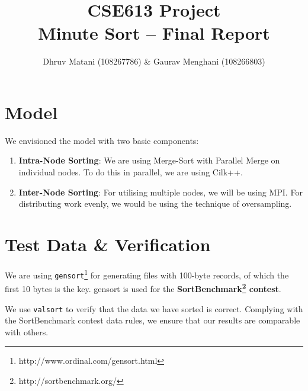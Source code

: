 \documentclass{article}
\title{CSE613 Project\\Minute Sort -- Final Report}
\author{Dhruv Matani (108267786) \& Gaurav Menghani (108266803)}
\begin{document}
\maketitle

\clearpage

\section{Model}
We envisioned the model with two basic components:
\begin{enumerate}
\item {\bf{Intra-Node Sorting}}: We are using Merge-Sort with Parallel Merge on individual nodes. To do this in parallel, 
we are using Cilk++. 

\item {\bf{Inter-Node Sorting}}: For utilising multiple nodes, we will be using MPI. For distributing work evenly, 
we would be using the technique of oversampling.
\end{enumerate}

\section{Test Data \& Verification}
We are using \verb#gensort#\footnote{http://www.ordinal.com/gensort.html} for generating files with 100-byte records, 
of which the first 10 bytes is the key. gensort is used for the {\bf SortBenchmark\footnote{http://sortbenchmark.org/} contest}.

We use \verb#valsort# to verify that the data we have sorted is correct. Complying with the SortBenchmark contest data rules, we ensure that our results are comparable with others.
\end{document}

